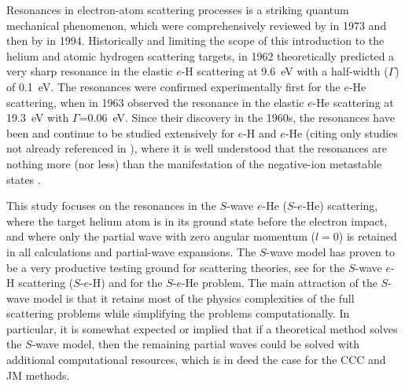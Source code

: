 \documentclass[aip
, pra
, showpacs
, aps
, twocolumn
, groupedaddress
, floatfix
]{revtex4}
\begin{document}
Resonances in electron-atom scattering processes is a striking quantum mechanical phenomenon, which were comprehensively reviewed by \citet{Schulz73} in 1973 and then by \citet{BC94} in 1994.
Historically and limiting the scope of this introduction to the helium and atomic hydrogen scattering targets, in 1962 \citet{BS62} theoretically predicted a very sharp resonance in the elastic $e$-H scattering  at 9.6~eV with a half-width ($\Gamma$) of 0.1~eV. The resonances were confirmed experimentally first for the $e$-He scattering, when in 1963 \citet{Schulz63} observed the resonance in the elastic $e$-He scattering at 19.3~eV with $\Gamma$=0.06~eV.
Since their discovery in the 1960s, the resonances have been and continue to be studied extensively
for $e$-H \cite{WC94,FRA94_pra,KM94pL741,OSB95p4320,DLTL96,DTLM99,DTL00} and $e$-He \cite{KM95pL139,HBSBB96,NP01,PN03,SMC2006} (citing only studies not already referenced in \cite{Schulz73,BC94}),
where it is well understood that the resonances are nothing more (nor less) than the manifestation of the negative-ion metastable states \cite{BC94}.


This study focuses on the resonances in the $S$-wave $e$-He ($S$-$e$-He) scattering,
where the target helium atom is in its ground state before the electron impact,
and where only the partial wave with zero angular momentum ($l=0$) is retained in all calculations
and partial-wave expansions.
The $S$-wave model has proven to be a very productive testing ground for scattering theories,
see \cite{T62,HY74p1209,P78,P80,P81,CO84,BS92p53,BST93,KM94pL407,IDHF95,PS96,JS02,JS00l,BRIM99,S99l,MHR02,BS04,Frapiccini10} for the $S$-wave $e$-H scattering ($S$-$e$-H)
and \cite{DHIF94,PMR99,PBFS02,PNBFS04,HMR05R,HMR05,BS10p022715,BS10p022716,KFB11} for  the $S$-$e$-He problem.
The main attraction of the $S$-wave model is that it retains most of the physics complexities of the full
scattering problems while simplifying the problems computationally.
In particular, it is somewhat expected or implied that if a theoretical method solves the $S$-wave model, then
the remaining partial waves could be solved with additional computational resources, which is in deed the case for the CCC \cite{FB95} and JM \cite{KM94pL741,KM95pL139} methods.
\end{document}
